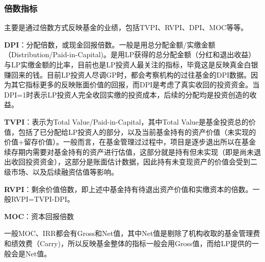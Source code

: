 \documentclass[
]{article}
\begin{document}
\hypertarget{ux500dux6570ux6307ux6807}{%
\subsubsection{倍数指标}\label{ux500dux6570ux6307ux6807}}

主要是通过倍数方式反映基金的业绩，包括TVPI、RVPI、DPI、MOC等等。

\textbf{DPI}：分配倍数，或现金回报倍数。一般是用总分配金额/实缴金额（Distribution/Paid-in-Capital)。是用LP获得的总分配金额（分红和退出收益）与LP实缴金额的比率，目前也是LP投资人最关注的指标，毕竟这是反映真金白银赚回来的钱。目前LP投资人尽调GP时，都会考察机构的过往基金的DPI数据。因为其它指标更多的反映账面价值的回报，而DPI是考虑了真实收回的投资资金。当DPI=1时表示LP投资人完全收回实缴的投资成本，后续的分配均是投资创造的收益。

\textbf{TVPI}：表示为Total Value/Paid-in-Capital，其中Total
Value是基金投资总的价值，包括了已分配给LP投资人的部分，以及当前基金持有的资产价值（未实现的价值+留存价值）。一般而言，在基金管理过过程中，项目是逐步退出所以在基金续存期内需要对基金持有的资产进行估值，这部分就是持有但未实现（即是尚未退出收回投资资金），这部分是账面估计数据，因此持有未变现资产的价值会受到二级市场、以及后续融资估值等影响。

\textbf{RVPI}：剩余价值倍数，即上述中基金持有待退出资产价值和实缴资本的倍数。一般RVPI=TVPI-DPI。

\textbf{MOC}：资本回报倍数

一般MOC、IRR都会有Gross和Net值，其中Net值是剔除了机构收取的基金管理费和绩效费（Carry)，所以反映基金整体的指标一般会用Gross值，而给LP提供的一般会是Net值。
\end{document}
